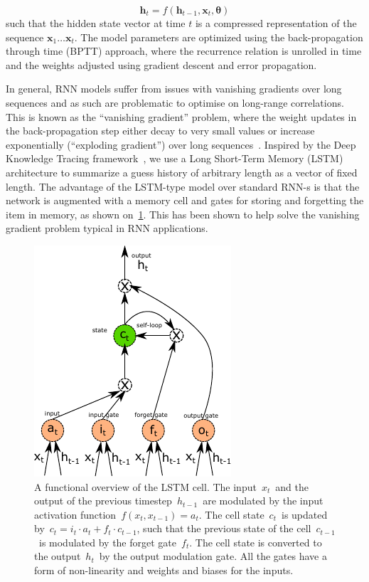 \begin{equation}
\mathbf{h}_t = f(\mathbf{h}_{t-1}, \mathbf{x}_t, \mathbf{\theta})
\end{equation}
such that the hidden state vector at time $t$ is a compressed representation of the sequence $\mathbf{x}_1 \dots \mathbf{x}_t$. The model parameters are optimized using the back-propagation through time (BPTT) approach, where the recurrence relation is unrolled in time and the weights adjusted using gradient descent and error propagation.

In general, RNN models suffer from issues with vanishing gradients over long sequences and as such are problematic to optimise on long-range correlations. This is known as the ``vanishing gradient'' problem, where the weight updates in the back-propagation step either decay to very small values or increase exponentially (``exploding gradient'') over long sequences~\cite{Bengio_learninglong-term}. Inspired by the Deep Knowledge Tracing framework~\cite{DBLP:journals/corr/PiechSHGSGS15}, we use a Long Short-Term Memory (LSTM)~\cite{gers1999learning} architecture to summarize a guess history of arbitrary length as a vector of fixed length. The advantage of the LSTM-type model over standard RNN-s is that the network is augmented with a memory cell and gates for storing and forgetting the item in memory, as shown on~\cref{fig:lstm_cell}. This has been shown to help solve the vanishing gradient problem typical in RNN applications. 


\begin{figure}
\centering
\includegraphics[width=0.6\linewidth]{figures/lingvist/lstm.pdf}
\caption[The long short-term memory cell]{A functional overview of the LSTM cell. The input~$x_t$~and the output of the previous timestep~$h_{t-1}$~are modulated by the input activation function~$f(x_t, x_{t-1}) = a_t$. The cell state~$c_t$~is updated by~$c_t = i_t \cdot a_t + f_t \cdot c_{t-1}$, such that the previous state of the cell~$c_{t-1}$~is modulated by the forget gate~$f_t$. The cell state is converted to the output~$h_t$~by the output modulation gate. All the gates have a form of non-linearity and weights and biases for the inputs.}
\label{fig:lstm_cell}
\end{figure} 


